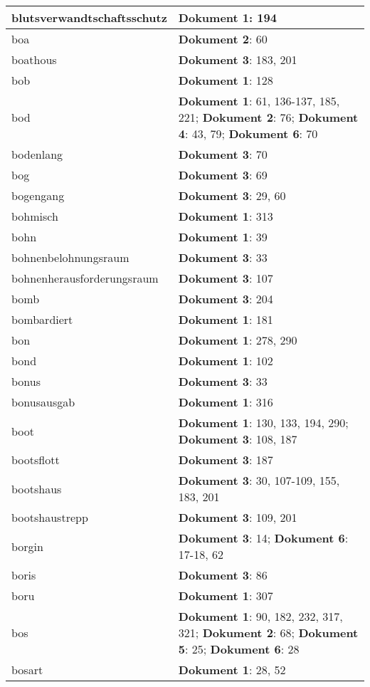 \documentclass[a5paper]{article}
\begin{document}
\begin{longtable}[l]{|l|p{3in}|}
\hline
blutsverwandtschaftsschutz & \textbf{Dokument 1}: 194 \\
\hline
boa & \textbf{Dokument 2}: 60 \\
\hline
boathous & \textbf{Dokument 3}: 183, 201 \\
\hline
bob & \textbf{Dokument 1}: 128 \\
\hline
bod & \textbf{Dokument 1}: 61, 136-137, 185, 221; \textbf{Dokument 2}: 76; \textbf{Dokument 4}: 43, 79; \textbf{Dokument 6}: 70 \\
\hline
bodenlang & \textbf{Dokument 3}: 70 \\
\hline
bog & \textbf{Dokument 3}: 69 \\
\hline
bogengang & \textbf{Dokument 3}: 29, 60 \\
\hline
bohmisch & \textbf{Dokument 1}: 313 \\
\hline
bohn & \textbf{Dokument 1}: 39 \\
\hline
bohnenbelohnungsraum & \textbf{Dokument 3}: 33 \\
\hline
bohnenherausforderungsraum & \textbf{Dokument 3}: 107 \\
\hline
bomb & \textbf{Dokument 3}: 204 \\
\hline
bombardiert & \textbf{Dokument 1}: 181 \\
\hline
bon & \textbf{Dokument 1}: 278, 290 \\
\hline
bond & \textbf{Dokument 1}: 102 \\
\hline
bonus & \textbf{Dokument 3}: 33 \\
\hline
bonusausgab & \textbf{Dokument 1}: 316 \\
\hline
boot & \textbf{Dokument 1}: 130, 133, 194, 290; \textbf{Dokument 3}: 108, 187 \\
\hline
bootsflott & \textbf{Dokument 3}: 187 \\
\hline
bootshaus & \textbf{Dokument 3}: 30, 107-109, 155, 183, 201 \\
\hline
bootshaustrepp & \textbf{Dokument 3}: 109, 201 \\
\hline
borgin & \textbf{Dokument 3}: 14; \textbf{Dokument 6}: 17-18, 62 \\
\hline
boris & \textbf{Dokument 3}: 86 \\
\hline
boru & \textbf{Dokument 1}: 307 \\
\hline
bos & \textbf{Dokument 1}: 90, 182, 232, 317, 321; \textbf{Dokument 2}: 68; \textbf{Dokument 5}: 25; \textbf{Dokument 6}: 28 \\
\hline
bosart & \textbf{Dokument 1}: 28, 52 \\

\end{longtable}
\end{document}
